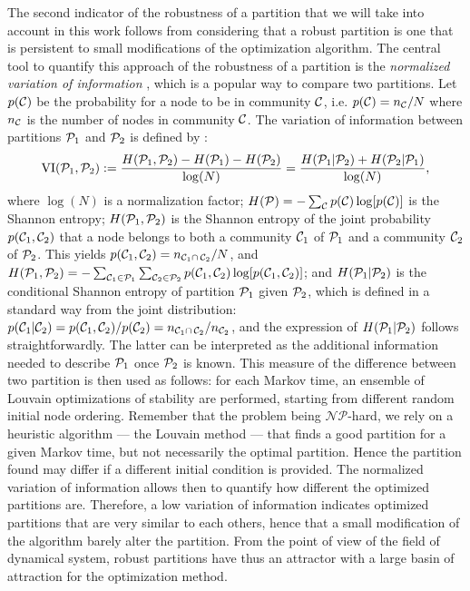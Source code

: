 \begin{sloppypar} 
The second indicator of the robustness of a partition that we will take into account in this work follows from considering that a robust partition is one that is persistent to small modifications of the optimization algorithm. The central tool to quantify this approach of the robustness of a partition is the \textit{normalized variation of information} \cite{meilua2007comparing}, which is a popular way to compare two partitions. Let $p(\C)$ be the probability for a node to be in community $\C$, i.e. $p(\C) = n_\C/N$ where $n_\C$ is the number of nodes in community $\C$. The variation of information between partitions $\P_1$ and $\P_2$ is defined by :
\begin{equation} \label{eq:clustering_VI}
	\VI(\P_1,\P_2) := \frac{H(\P_1,\P_2)-H(\P_1)-H(\P_2)}{\log (N)} = \frac{H(\P_1|\P_2)+H(\P_2|\P_1)}{\log (N)},
\end{equation}
where $\log(N)$ is a normalization factor; $H(\P) = -\sum_{\C} p(\C) \log[p(\C)]$ is the Shannon entropy; $H(\P_1,\P_2)$ is the Shannon entropy of the joint probability $p(\C_1,\C_2)$ that a node belongs to both a community $\C_1$ of $\P_1$ and a community $\C_2$ of $\P_2$. This yields $p(\C_1,\C_2) = n_{\C_1 \cap\, \C_2}/N$, and $H(\P_1,\P_2) = -\sum_{\C_1 \in \P_1} \sum_{\C_2 \in \P_2} p(\C_1,\C_2) \log[p(\C_1,\C_2)]$; and $H(\P_1|\P_2)$ is the conditional Shannon entropy of partition $\P_1$ given $\P_2$, which is defined in a standard way from the joint distribution: $p(\C_1|\C_2) = p(\C_1,\C_2)/p(\C_2) = n_{\C_1\cap\, \C_2}/n_{\C_2}$, and the expression of $H(\P_1|\P_2)$ follows straightforwardly. The latter can be interpreted as the additional information needed to describe $\P_1$ once $\P_2$ is known. This measure of the difference between two partition is then used as follows: for each Markov time, an ensemble of Louvain optimizations of stability are performed, starting from different random initial node ordering. Remember that the problem being $\mathcal{NP}$-hard, we rely on a heuristic algorithm --- the Louvain method --- that finds a good partition for a given Markov time, but not necessarily the optimal partition. Hence the partition found may differ if a different initial condition is provided. The normalized variation of information allows then to quantify how different the optimized partitions are. Therefore, a low variation of information indicates optimized partitions that are very similar to each others, hence that a small modification of the algorithm barely alter the partition. From the point of view of the field of dynamical system, robust partitions have thus an attractor with a large basin of attraction for the optimization method. 
\end{sloppypar}